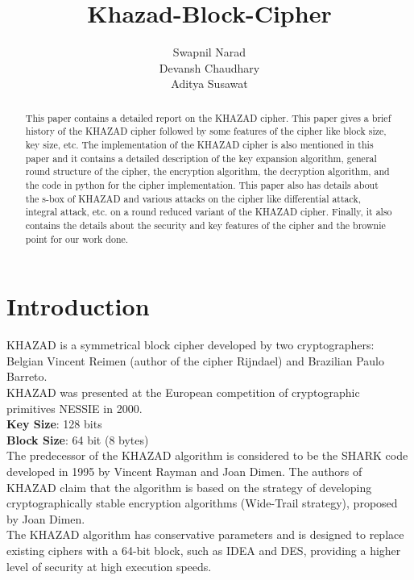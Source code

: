 \documentclass[preprint]{transcrypto}
\author{Swapnil Narad \\ Devansh Chaudhary \\ Aditya Susawat }
\institute{
  IIT Bhilai, Raipur, India, \email{swapniln@iitbhilai.ac.in}
  \and
  IIT Bhilai, Raipur, India, \email{devanshc@iitbhilai.ac.in}
  \and
  IIT Bhilai, Raipur, India, \email{adityaks@iitbhilai.ac.in}
}
\title{Khazad-Block-Cipher}
\begin{document}
\maketitle




\begin{abstract}
   This paper contains a detailed report on the KHAZAD cipher. This paper gives a brief history of the KHAZAD cipher followed by some features of the cipher like block size, key size, etc. The implementation of the KHAZAD cipher is also mentioned in this paper and it contains a detailed description of the key expansion algorithm, general round structure of the cipher, the encryption algorithm, the decryption algorithm, and the code in python for the cipher implementation. This paper also has details about the s-box of KHAZAD and various attacks on the cipher like differential attack, integral attack, etc. on a round reduced variant of the KHAZAD cipher. Finally, it also contains the details about the security and key features of the cipher and the brownie point for our work done. \\
\end{abstract}


\section{Introduction}
KHAZAD is a symmetrical block cipher developed by two cryptographers: Belgian Vincent Reimen (author of the cipher Rijndael) and Brazilian Paulo Barreto. \cite{4}\\
KHAZAD was presented at the European competition of cryptographic primitives NESSIE in 2000.\\
\textbf{Key Size}: 128 bits\\
\textbf{Block Size}: 64 bit (8 bytes) \\

The predecessor of the KHAZAD algorithm is considered to be the SHARK code developed in 1995 by Vincent Rayman and Joan Dimen. The authors of KHAZAD claim that the algorithm is based on the strategy of developing cryptographically stable encryption algorithms (Wide-Trail strategy), proposed by Joan Dimen.\\

The KHAZAD algorithm has conservative parameters and is designed to replace existing ciphers with a 64-bit block, such as IDEA and DES, providing a higher level of security at high execution speeds.\\
\end{document}
